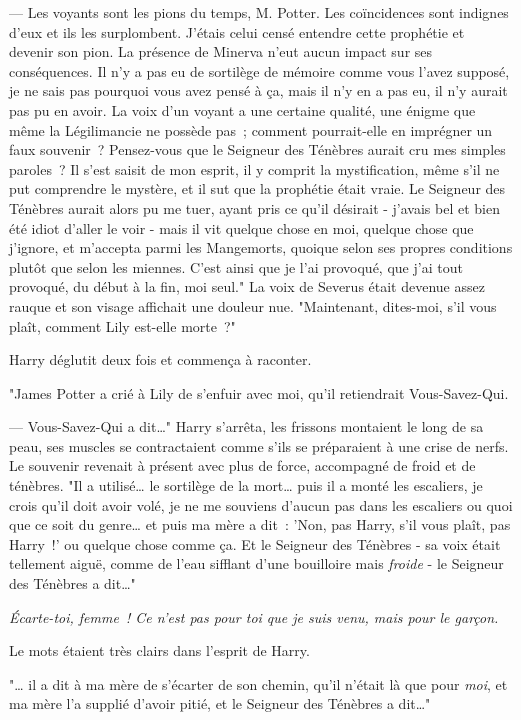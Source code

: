 --- Les voyants sont les pions du temps, M. Potter. Les coïncidences sont indignes d'eux et ils les surplombent. J'étais celui censé entendre cette prophétie et devenir son pion. La présence de Minerva n'eut aucun impact sur ses conséquences. Il n'y a pas eu de sortilège de mémoire comme vous l'avez supposé, je ne sais pas pourquoi vous avez pensé à ça, mais il n'y en a pas eu, il n'y aurait pas pu en avoir. La voix d'un voyant a une certaine qualité, une énigme que même la Légilimancie ne possède pas~; comment pourrait-elle en imprégner un faux souvenir~? Pensez-vous que le Seigneur des Ténèbres aurait cru mes simples paroles~? Il s'est saisit de mon esprit, il y comprit la mystification, même s'il ne put comprendre le mystère, et il sut que la prophétie était vraie. Le Seigneur des Ténèbres aurait alors pu me tuer, ayant pris ce qu'il désirait - j'avais bel et bien été idiot d'aller le voir - mais il vit quelque chose en moi, quelque chose que j'ignore, et m'accepta parmi les Mangemorts, quoique selon ses propres conditions plutôt que selon les miennes. C'est ainsi que je l'ai provoqué, que j'ai tout provoqué, du début à la fin, moi seul." La voix de Severus était devenue assez rauque et son visage affichait une douleur nue. "Maintenant, dites-moi, s'il vous plaît, comment Lily est-elle morte~?"

Harry déglutit deux fois et commença à raconter.

"James Potter a crié à Lily de s'enfuir avec moi, qu'il retiendrait Vous-Savez-Qui.

--- Vous-Savez-Qui a dit…" Harry s'arrêta, les frissons montaient le long de sa peau, ses muscles se contractaient comme s'ils se préparaient à une crise de nerfs. Le souvenir revenait à présent avec plus de force, accompagné de froid et de ténèbres. "Il a utilisé… le sortilège de la mort… puis il a monté les escaliers, je crois qu'il doit avoir volé, je ne me souviens d'aucun pas dans les escaliers ou quoi que ce soit du genre… et puis ma mère a dit~: 'Non, pas Harry, s'il vous plaît, pas Harry~!' ou quelque chose comme ça. Et le Seigneur des Ténèbres - sa voix était tellement aiguë, comme de l'eau sifflant d'une bouilloire mais \emph{froide} - le Seigneur des Ténèbres a dit…"

\emph{Écarte-toi, femme~! Ce n'est pas pour toi que je suis venu, mais pour le garçon.}

Le mots étaient très clairs dans l'esprit de Harry.

"… il a dit à ma mère de s'écarter de son chemin, qu'il n'était là que pour \emph{moi}, et ma mère l'a supplié d'avoir pitié, et le Seigneur des Ténèbres a dit…"

